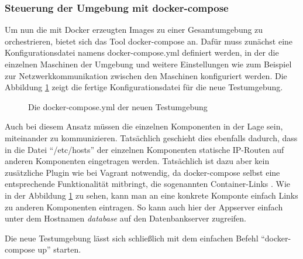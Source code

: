 \subsubsection{Steuerung der Umgebung mit docker-compose}

Um nun die mit Docker erzeugten Images zu einer Gesamtumgebung zu orchestrieren, bietet sich das Tool docker-compose \citep[Vgl.][]{dockercompose} an. Dafür muss zunächst eine Konfigurationsdatei namens docker-compose.yml definiert werden, in der die einzelnen Maschinen der Umgebung und weitere Einstellungen wie zum Beispiel zur Netzwerkkommunikation zwischen den Maschinen konfiguriert werden. Die Abbildung \ref{dockercomposeyml} zeigt die fertige Konfigurationsdatei für die neue Testumgebung.

\begin{figure}[!ht]
  \begin{center}
    \caption{Die docker-compose.yml der neuen Testumgebung}
    \label{dockercomposeyml}
  \end{center}
\end{figure}

Auch bei diesem Ansatz müssen die einzelnen Komponenten in der Lage sein, miteinander zu kommunizieren. Tatsächlich geschieht dies ebenfalls dadurch, dass in die Datei "`/etc/hosts"' der einzelnen Komponenten statische IP-Routen auf anderen Komponenten eingetragen werden. Tatsächlich ist dazu aber kein zusätzliche Plugin wie bei Vagrant notwendig, da docker-compose selbst eine entsprechende Funktionalität mitbringt, die sogenannten Container-Links \citep[Vgl.][]{dockerlinks}. Wie in der Abbildung \ref{dockercomposeyml} zu sehen, kann man an eine konkrete Komponte einfach Links zu anderen Komponenten eintragen. So kann auch hier der Appserver einfach unter dem Hostnamen \textit{database} auf den Datenbankserver zugreifen.

Die neue Testumgebung lässt sich schließlich mit dem einfachen Befehl "`docker-compose up"' starten.


